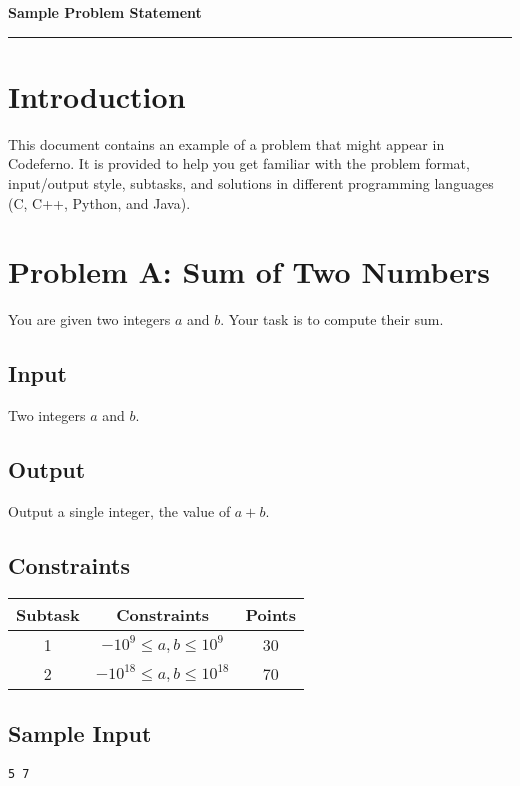 \documentclass[12pt,a4paper]{article}
\begin{document}
\ifdefined\BOOKLET
  \pagestyle{empty}
\fi

\begin{center}
    {\LARGE \textbf{Sample Problem Statement}} \\[0.5em]
    \rule{\textwidth}{0.4pt}
\end{center}

\vspace{1em}

\section*{Introduction}
This document contains an example of a problem that might appear in Codeferno.  
It is provided to help you get familiar with the problem format, input/output style, subtasks, and solutions in different programming languages (C, C++, Python, and Java).  

\section*{Problem A: Sum of Two Numbers}
You are given two integers $a$ and $b$. Your task is to compute their sum.

\subsection*{Input}
Two integers $a$ and $b$.

\subsection*{Output}
Output a single integer, the value of $a+b$.

\subsection*{Constraints}
\begin{tabular}{|c|c|c|}
\hline
\textbf{Subtask} & \textbf{Constraints} & \textbf{Points} \\
\hline
1 & $-10^9 \leq a, b \leq 10^9$ & 30 \\
\hline
2 & $-10^{18} \leq a, b \leq 10^{18}$ & 70 \\
\hline
\end{tabular}

\subsection*{Sample Input}
\begin{verbatim}
5 7
\end{verbatim}
\end{document}
